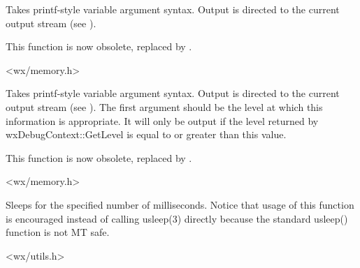 
Takes printf-style variable argument syntax. Output
is directed to the current output stream (see ).

This function is now obsolete, replaced by .


<wx/memory.h>

\label{wxtracelevel}


Takes printf-style variable argument syntax. Output
is directed to the current output stream (see ).
The first argument should be the level at which this information is appropriate.
It will only be output if the level returned by wxDebugContext::GetLevel is equal to or greater than
this value.

This function is now obsolete, replaced by .


<wx/memory.h>

\label{wxusleep}


Sleeps for the specified number of milliseconds. Notice that usage of this
function is encouraged instead of calling usleep(3) directly because the
standard usleep() function is not MT safe.


<wx/utils.h>

\label{wxwriteresource}




